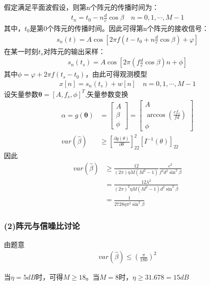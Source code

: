 \documentclass[fontset=windows]{article}
\numberwithin{figure}{section}
\begin{document}
假定满足平面波假设，则第n个阵元的传播时间为：
\begin{align*}
	t_n=t_0-n\frac{d}{c}\cos \beta \quad n=0,1,\cdots,M-1
\end{align*}
其中，\(t_0\)是第0个阵元的传播时间。因此可得第n个阵元的接收信号：
\begin{align*}
	s_n(t)=A\cos \left[2\pi f(t-t_0+n\frac{d}{c}\cos \beta)+\varphi\right]
\end{align*}
在某一时刻\(t_s\)对阵元的输出采样：
\begin{align*}
	s_n(t_s)=A\cos\left[2\pi (f\frac{d}{c}\cos\beta)n+\phi\right]
\end{align*}
其中\(\phi=\varphi+2\pi f(t_s-t_0)\)，由此可得观测模型
\begin{align*}
	x[n]=s_n(t_s)+w[n]\quad n=0,1,\cdots,M-1
\end{align*}
设矢量参数\(\boldsymbol{\theta}=[A,f_s,\phi]^T\),矢量参数变换
\begin{align*}
	\alpha=g(\boldsymbol{\theta}) & =
	\begin{bmatrix}
		A \\\beta\\\phi
	\end{bmatrix}=
	\begin{bmatrix}
		A \\\arccos(\frac{cf_s}{fd})\\\phi
	\end{bmatrix}    \\
	var(\hat{\beta})              & \geq
	\left[\frac{\partial g(\theta)}{\partial \theta}\right]^2_{22}\left[I^{-1}(\theta)\right]_{22}
\end{align*}
因此
\begin{align*}
	var(\hat{\beta})
	 & \geq \frac{12}{(2\pi )\eta M(M^2-1)}\frac{c^2}{f^2d^2\sin^2\beta} \\
	 & =\frac{12\lambda^2}{(2\pi)^2\eta M(M^2-1)d^2\sin^2\beta}          \\
	 & =\frac{1}{2728\eta \pi^2\sin^2\beta}
\end{align*}

\subsubsection*{(2)阵元与信噪比讨论}
由题意
\begin{align*}
	var(\hat{\beta})\leq (\frac{\pi}{180})^2
\end{align*}

当\(\eta=5dB\)时，可得\(M\geq 18\)。当\(M=8\)时，\(\eta\geq 31.678=15dB\)
\end{document}
